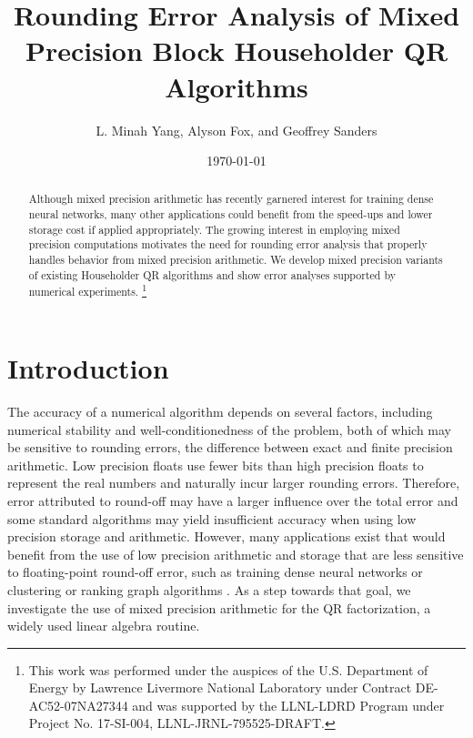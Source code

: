 \documentclass[review,onefignum,onetabnum]{siamart190516}
\title{Rounding Error Analysis of Mixed Precision Block Householder QR Algorithms}
\author{L. Minah Yang, Alyson Fox, and Geoffrey Sanders}
\date{\today}
\newcommand\blfootnote[1]{%
	\begingroup
	\renewcommand\thefootnote{}\footnote{#1}%
	\addtocounter{footnote}{-1}%
	\endgroup
}
\begin{document}
\maketitle
\begin{abstract}
	Although mixed precision arithmetic has recently garnered interest for training dense neural networks, many other applications could benefit from the  speed-ups and lower storage cost if applied appropriately. 
	The growing interest in employing mixed precision computations motivates the need for rounding error analysis that properly handles behavior from mixed precision arithmetic.
	We develop mixed precision variants of existing Householder QR algorithms and show error analyses supported by numerical experiments.	\blfootnote{This work was performed under the auspices of the U.S. Department of Energy by Lawrence Livermore National Laboratory under Contract DE-AC52-07NA27344 and was supported by the LLNL-LDRD Program under Project No. 17-SI-004, LLNL-JRNL-795525-DRAFT.}
\end{abstract}
\section{Introduction}\label{sec:intro}
%
The accuracy of a numerical algorithm depends on several factors, including numerical stability and well-conditionedness of the problem, both of which may be sensitive to rounding errors, the difference between exact and finite precision arithmetic. 
Low precision floats use fewer bits than high precision floats to represent the real numbers and naturally incur larger rounding errors. 
Therefore, error attributed to round-off may have a larger influence over the total error and some standard algorithms may yield insufficient accuracy when using low precision storage and arithmetic.
However, many applications exist that would benefit from the use of low precision arithmetic and storage that are less sensitive to floating-point round-off error, such as training dense neural networks \cite{micikevicius2018mixed} or clustering or ranking graph algorithms \cite{vonLuxburg2007}.
As a step towards that goal, we investigate the use of mixed precision arithmetic for the QR factorization, a widely used linear algebra routine.
\par
\end{document}
